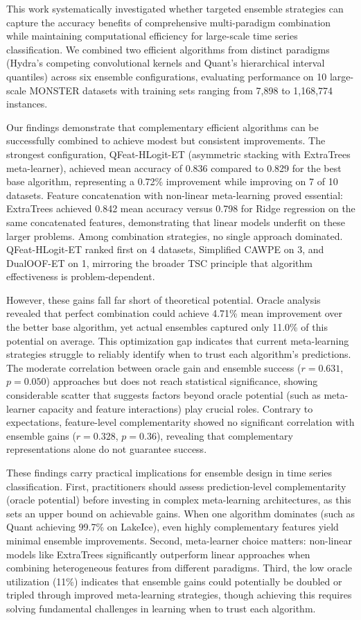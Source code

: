 \documentclass[pdflatex,sn-basic]{sn-jnl}           %
\theoremstyle{thmstyleone}%
\theoremstyle{thmstyletwo}%
\theoremstyle{thmstylethree}%
\begin{document}
This work systematically investigated whether targeted ensemble strategies can capture the accuracy benefits of comprehensive multi-paradigm combination while maintaining computational efficiency for large-scale time series classification. We combined two efficient algorithms from distinct paradigms (Hydra's competing convolutional kernels and Quant's hierarchical interval quantiles) across six ensemble configurations, evaluating performance on 10 large-scale MONSTER datasets with training sets ranging from 7,898 to 1,168,774 instances.

Our findings demonstrate that complementary efficient algorithms can be successfully combined to achieve modest but consistent improvements. The strongest configuration, QFeat-HLogit-ET (asymmetric stacking with ExtraTrees meta-learner), achieved mean accuracy of 0.836 compared to 0.829 for the best base algorithm, representing a 0.72\% improvement while improving on 7 of 10 datasets. Feature concatenation with non-linear meta-learning proved essential: ExtraTrees achieved 0.842 mean accuracy versus 0.798 for Ridge regression on the same concatenated features, demonstrating that linear models underfit on these larger problems. Among combination strategies, no single approach dominated. QFeat-HLogit-ET ranked first on 4 datasets, Simplified CAWPE on 3, and DualOOF-ET on 1, mirroring the broader TSC principle that algorithm effectiveness is problem-dependent.

However, these gains fall far short of theoretical potential. Oracle analysis revealed that perfect combination could achieve 4.71\% mean improvement over the better base algorithm, yet actual ensembles captured only 11.0\% of this potential on average. This optimization gap indicates that current meta-learning strategies struggle to reliably identify when to trust each algorithm's predictions. The moderate correlation between oracle gain and ensemble success ($r=0.631$, $p=0.050$) approaches but does not reach statistical significance, showing considerable scatter that suggests factors beyond oracle potential (such as meta-learner capacity and feature interactions) play crucial roles. Contrary to expectations, feature-level complementarity showed no significant correlation with ensemble gains ($r=0.328$, $p=0.36$), revealing that complementary representations alone do not guarantee success.

These findings carry practical implications for ensemble design in time series classification. First, practitioners should assess prediction-level complementarity (oracle potential) before investing in complex meta-learning architectures, as this sets an upper bound on achievable gains. When one algorithm dominates (such as Quant achieving 99.7\% on LakeIce), even highly complementary features yield minimal ensemble improvements. Second, meta-learner choice matters: non-linear models like ExtraTrees significantly outperform linear approaches when combining heterogeneous features from different paradigms. Third, the low oracle utilization (11\%) indicates that ensemble gains could potentially be doubled or tripled through improved meta-learning strategies, though achieving this requires solving fundamental challenges in learning when to trust each algorithm.
\end{document}
